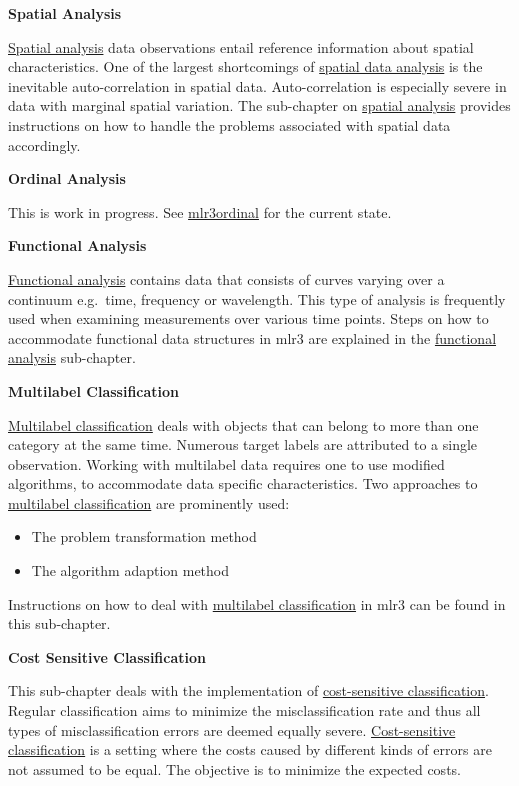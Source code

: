 \documentclass[]{article}
\providecommand{\tightlist}{%
  \setlength{\itemsep}{0pt}\setlength{\parskip}{0pt}}
\begin{document}
\textbf{Spatial Analysis}

\protect\hyperlink{spatial}{Spatial analysis} data observations entail reference information about spatial characteristics.
One of the largest shortcomings of \protect\hyperlink{spatial}{spatial data analysis} is the inevitable auto-correlation in spatial data.
Auto-correlation is especially severe in data with marginal spatial variation.
The sub-chapter on \protect\hyperlink{spatial}{spatial analysis} provides instructions on how to handle the problems associated with spatial data accordingly.

\textbf{Ordinal Analysis}

This is work in progress.
See \href{https://github.com/mlr-org/mlr3ordinal}{mlr3ordinal} for the current state.

\textbf{Functional Analysis}

\protect\hyperlink{functional}{Functional analysis} contains data that consists of curves varying over a continuum e.g.~time, frequency or wavelength.
This type of analysis is frequently used when examining measurements over various time points.
Steps on how to accommodate functional data structures in mlr3 are explained in the \protect\hyperlink{functional}{functional analysis} sub-chapter.

\textbf{Multilabel Classification}

\protect\hyperlink{multilabel}{Multilabel classification} deals with objects that can belong to more than one category at the same time.
Numerous target labels are attributed to a single observation.
Working with multilabel data requires one to use modified algorithms, to accommodate data specific characteristics.
Two approaches to \protect\hyperlink{multilabel}{multilabel classification} are prominently used:

\begin{itemize}
\tightlist
\item
  The problem transformation method
\item
  The algorithm adaption method
\end{itemize}

Instructions on how to deal with \protect\hyperlink{multilabel}{multilabel classification} in mlr3 can be found in this sub-chapter.

\textbf{Cost Sensitive Classification}

This sub-chapter deals with the implementation of \protect\hyperlink{cost-sens}{cost-sensitive classification}.
Regular classification aims to minimize the misclassification rate and thus all types of misclassification errors are deemed equally severe.
\protect\hyperlink{cost-sens}{Cost-sensitive classification} is a setting where the costs caused by different kinds of errors are not assumed to be equal.
The objective is to minimize the expected costs.
\end{document}
